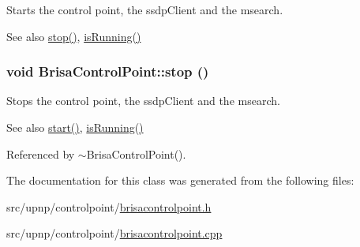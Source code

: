 Starts the control point, the ssdpClient and the msearch. \begin{DoxySeeAlso}{See also}
\hyperlink{classBrisaUpnp_1_1BrisaControlPoint_a39876b0ff6901907710cd6f7782c4f52}{stop()}, \hyperlink{classBrisaUpnp_1_1BrisaControlPoint_ac42e2c437a1ced595f407d7ce386cf81}{isRunning()} 
\end{DoxySeeAlso}
\hypertarget{classBrisaUpnp_1_1BrisaControlPoint_a39876b0ff6901907710cd6f7782c4f52}{
\subsubsection[{stop}]{\setlength{\rightskip}{0pt plus 5cm}void BrisaControlPoint::stop ()}}
\label{classBrisaUpnp_1_1BrisaControlPoint_a39876b0ff6901907710cd6f7782c4f52}


Stops the control point, the ssdpClient and the msearch. \begin{DoxySeeAlso}{See also}
\hyperlink{classBrisaUpnp_1_1BrisaControlPoint_ab370001909d0f7b0ec059b693675d964}{start()}, \hyperlink{classBrisaUpnp_1_1BrisaControlPoint_ac42e2c437a1ced595f407d7ce386cf81}{isRunning()} 
\end{DoxySeeAlso}


Referenced by $\sim$BrisaControlPoint().

The documentation for this class was generated from the following files:\begin{DoxyCompactItemize}
\item 
src/upnp/controlpoint/\hyperlink{brisacontrolpoint_8h}{brisacontrolpoint.h}\item 
src/upnp/controlpoint/\hyperlink{brisacontrolpoint_8cpp}{brisacontrolpoint.cpp}\end{DoxyCompactItemize}
